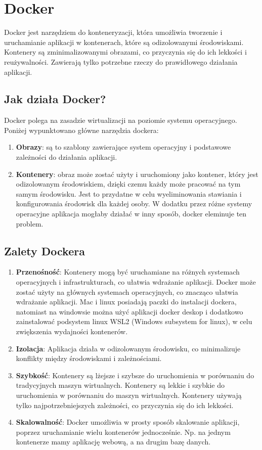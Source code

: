 \section{Docker}
Docker \cite{Docker} jest narzędziem do konteneryzacji, która umożliwia tworzenie i uruchamianie aplikacji w kontenerach, które są odizolowanymi środowiskami. Kontenery są zminimalizowanymi obrazami, co przyczynia się do ich lekkości i reużywalności. Zawierają tylko potrzebne rzeczy do prawidłowego działania aplikacji. 
\subsection{Jak działa Docker?}
Docker polega na zasadzie wirtualizacji na poziomie systemu operacyjnego. Poniżej wypunktowano główne narzędzia dockera:
\begin{enumerate}
    \item \textbf{Obrazy}: są to szablony zawierające system operacyjny i podstawowe zależności do działania aplikacji.
    \item \textbf{Kontenery}:
    obraz może zostać użyty i uruchomiony jako kontener, który jest odizolowanym środowiskiem, dzięki czemu każdy może pracować na tym samym środowisku. Jest to przydatne w celu wyeliminowania stawiania i konfigurowania środowisk dla każdej osoby. W dodatku przez różne systemy operacyjne aplikacja mogłaby działać w inny sposób, docker eleminuje ten problem.
\end{enumerate}

\subsection{Zalety Dockera}
\begin{enumerate}
    \item \textbf{Przenośność}: Kontenery mogą być uruchamiane na różnych systemach operacyjnych i infrastrukturach, co ułatwia wdrażanie aplikacji.
    Docker może zostać użyty na głównych systemach operacyjnych, co znacząco ułatwia wdrażanie aplikacji. Mac i linux posiadają paczki do instalacji dockera, natomiast na windowsie można użyć aplikacji docker deskop i dodatkowo zainstalować podsystem linux WSL2 (Windows subsystem for linux), w celu zwiększenia wydajności kontenerów.
    \item \textbf{Izolacja}:
    Aplikacja działa w odizolowanym środowisku, co minimalizuje konflikty między środowiskami i zależnościami.
    \item \textbf{Szybkość}: Kontenery są lżejsze i szybsze do uruchomienia w porównaniu do tradycyjnych maszyn wirtualnych.
    Kontenery są lekkie i szybkie do uruchomienia w porównaniu do maszyn wirtualnych. Kontenery używają tylko najpotrzebniejszych zależności, co przyczynia się do ich lekkości.
    \item \textbf{Skalowalność}: Docker umożliwia w prosty sposób skalowanie aplikacji, poprzez uruchamianie wielu kontenerów jednocześnie. Np. na jednym kontenerze mamy aplikację webową, a na drugim bazę danych.
\end{enumerate}
